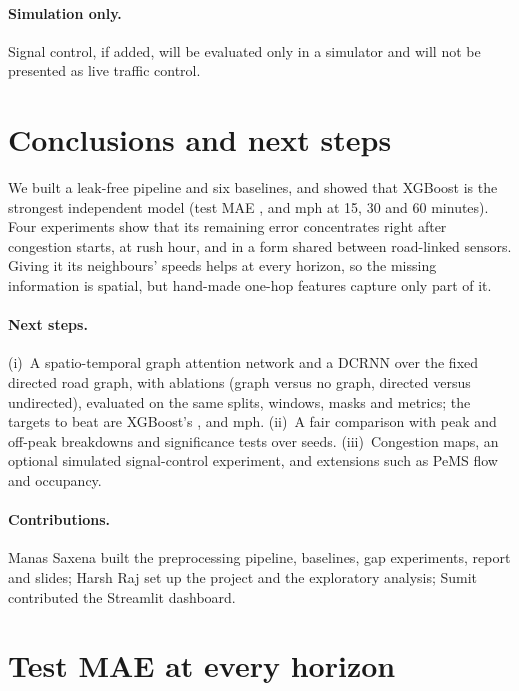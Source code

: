 \documentclass[11pt,a4paper]{article}
\begin{document}
\paragraph{Simulation only.}
Signal control, if added, will be evaluated only in a simulator and will not be presented as live traffic control.

\section{Conclusions and next steps}\label{sec:conclusion}
We built a leak-free pipeline and six baselines, and showed that XGBoost is the strongest independent model (test MAE \xgbMAEFifteen, \xgbMAEThirty{} and \xgbMAESixty{} mph at 15, 30 and 60 minutes).
Four experiments show that its remaining error concentrates right after congestion starts, at rush hour, and in a form shared between road-linked sensors.
Giving it its neighbours' speeds helps at every horizon, so the missing information is spatial, but hand-made one-hop features capture only part of it.

\paragraph{Next steps.}
(i)~A spatio-temporal graph attention network and a DCRNN \citep{li2018dcrnn} over the fixed directed road graph, with ablations (graph versus no graph, directed versus undirected), evaluated on the same splits, windows, masks and metrics; the targets to beat are XGBoost's \xgbMAEFifteen, \xgbMAEThirty{} and \xgbMAESixty{} mph.
(ii)~A fair comparison with peak and off-peak breakdowns and significance tests over seeds.
(iii)~Congestion maps, an optional simulated signal-control experiment, and extensions such as PeMS flow and occupancy.

\paragraph{Contributions.}
Manas Saxena built the preprocessing pipeline, baselines, gap experiments, report and slides; Harsh Raj set up the project and the exploratory analysis; Sumit contributed the Streamlit dashboard.




\appendix
\section{Test MAE at every horizon}\label{app:horizon}
\begin{table}[ht]
\centering\scriptsize
{}
\caption{Test MAE (mph) at forecast horizons of 5 to 60 minutes (column headings in minutes).}
\end{table}
\end{document}
